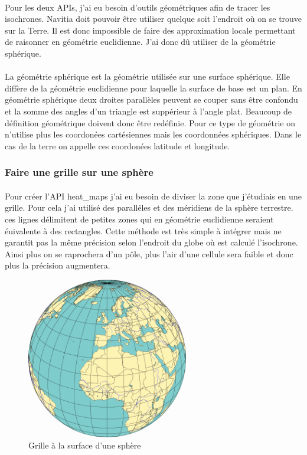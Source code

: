 \documentclass[a4paper]{report}
\begin{document}
\paragraph{} Pour les deux APIs, j'ai eu besoin d'outils géométriques afin de tracer les isochrones. Navitia doit pouvoir être utiliser quelque soit l'endroit où on se trouve sur la Terre. Il est donc impossible de faire des approximation locale permettant de raisonner en géométrie euclidienne. J'ai donc dû utiliser de la géométrie sphérique.

\paragraph{} La géométrie sphérique est la géométrie utilisée sur une surface sphérique. Elle diffère de la géométrie euclidienne pour laquelle la surface de base est un plan. En géométrie sphérique deux droites parallèles peuvent se couper sans être confondu et la somme des angles d'un triangle est suppérieur à l'angle plat. Beaucoup de définition géométrique doivent donc être redéfinie. Pour ce type de géométrie on n'utilise plus les coordonées cartésiennes mais les coordonnées sphériques. Dans le cas de la terre on appelle ces coordonées latitude et longitude.

\subsubsection{Faire une grille sur une sphère}

\paragraph{} Pour créer l'API heat\_maps j'ai eu besoin de diviser la zone que j'étudiais en une grille. Pour cela j'ai utilisé des paralléles et des méridiens de la sphère terrestre. ces lignes délimitent de petites zones qui en géométrie euclidienne seraient éuivalente à des rectangles. Cette méthode est très simple à intégrer mais ne garantit pas la même précision selon l'endroit du globe où est calculé l'isochrone. Ainsi plus on se raprochera d'un pôle, plus l'air d'une cellule sera faible et donc plus la précision augmentera.

\begin{figure}[H]
	\begin{center}
		\includegraphics[width=200pt]{image/grille_sphere}
		\caption{Grille à la surface d'une sphère}
		\label{Grille à la surface d'une sphère}
	\end{center}
\end{figure}
\end{document}
